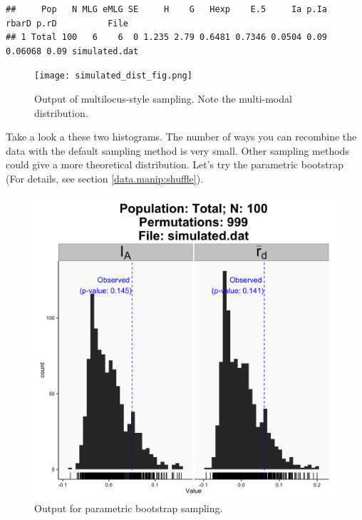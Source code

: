 \documentclass[letterpaper]{article}\usepackage[]{graphicx}\usepackage[]{color}
\makeatletter
\newenvironment{kframe}{%
 \def\at@end@of@kframe{}%
 \ifinner\ifhmode%
  \def\at@end@of@kframe{\end{minipage}}%
  \begin{minipage}{\columnwidth}%
 \fi\fi%
 \def\FrameCommand##1{\hskip\@totalleftmargin \hskip-\fboxsep
 \colorbox{shadecolor}{##1}\hskip-\fboxsep
     \hskip-\linewidth \hskip-\@totalleftmargin \hskip\columnwidth}%
 \MakeFramed {\advance\hsize-\width
   \@totalleftmargin\z@ \linewidth\hsize
   \@setminipage}}%
 {\par\unskip\endMakeFramed%
 \at@end@of@kframe}
\newenvironment{knitrout}{}{} %
\makeatother
\begin{document}
\begin{knitrout}\footnotesize
{}\color{fgcolor}\begin{kframe}
\begin{verbatim}
##     Pop   N MLG eMLG SE     H    G   Hexp    E.5     Ia p.Ia   rbarD p.rD          File
## 1 Total 100   6    6  0 1.235 2.79 0.6481 0.7346 0.0504 0.09 0.06068 0.09 simulated.dat
\end{verbatim}
\end{kframe}
\end{knitrout}

\begin{figure}[h!]
  \centering
  \caption{\footnotesize Output of multilocus-style sampling. Note the multi-modal distribution.}
  \label{simulated_dist_fig}
  \texttt{[image: simulated\_dist\_fig.png]}
\end{figure}
\newpage

Take a look a these two histograms. The number of ways you can recombine the data with the default sampling method is very small. Other sampling methods could give a more theoretical distribution. Let's try the parametric bootstrap (For details, see section \ref{data.manip:shuffle}).
\begin{figure}[h!]
  \centering
  \caption{\footnotesize Output for parametric bootstrap sampling.}
  \label{simulated_param_fig}
  \includegraphics{simulated_param_fig.png}
\end{figure}
\end{document}
